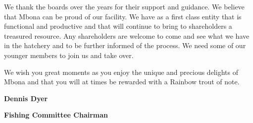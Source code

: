 We thank the boards over the years for their support and guidance. We believe that Mbona can be proud of our facility. 
We have as a first class entity that is functional and productive and that will continue to bring to shareholders a treasured resource. 
Any shareholders are welcome to come and see what we have in the hatchery and to be further informed of the process. 
We need some of our younger members to join us and take over.

We wish you great moments as you enjoy the unique and precious delights of Mbona and that you will at times be rewarded with a Rainbow trout of note.


{\bf Dennis Dyer}

{\bf Fishing Committee Chairman}












